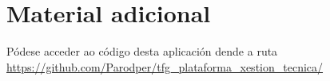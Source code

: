 \chapter{Material adicional}
\label{chap:adicional}

Pódese acceder ao código desta aplicación dende a ruta \url{https://github.com/Parodper/tfg_plataforma_xestion_tecnica/}